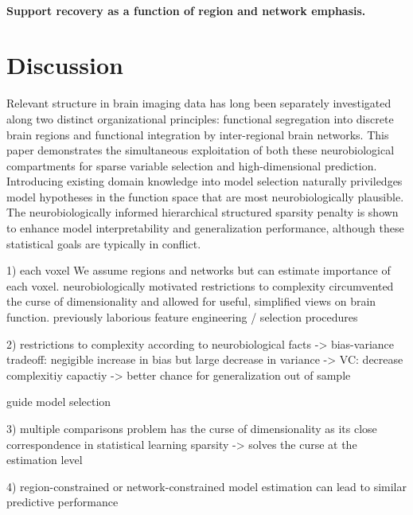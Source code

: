 \documentclass{article} %
\begin{document}
\paragraph{Support recovery as a function of region and network emphasis.}








\section{Discussion}
Relevant structure in brain imaging data has long been
separately investigated
along two distinct organizational principles:
functional segregation into discrete brain regions
and functional integration by inter-regional brain networks.
%
This paper demonstrates the simultaneous exploitation of
both these neurobiological compartments
for sparse variable selection and high-dimensional prediction.
%
Introducing existing domain knowledge into model selection
naturally priviledges model hypotheses in the function space
that are most neurobiologically plausible.
%
The neurobiologically informed
hierarchical structured sparsity penalty is shown to enhance
model interpretability and generalization performance,
although these statistical goals are typically in conflict.




1) each voxel
We assume regions and networks but can estimate 
importance of each voxel.
neurobiologically motivated restrictions to
complexity circumvented the curse of dimensionality and allowed
for useful, simplified views on brain function.
previously laborious feature engineering / selection procedures


2) restrictions to complexity according to neurobiological facts
-> bias-variance tradeoff: negigible increase in bias but large decrease in variance
-> VC: decrease complexitiy capactiy -> better chance for generalization out of sample

guide model selection

3)
multiple comparisons problem has the curse of dimensionality
as its close correspondence in statistical learning
sparsity -> solves the curse at the estimation level

4) region-constrained or network-constrained model estimation
can lead to similar predictive performance
\end{document}
